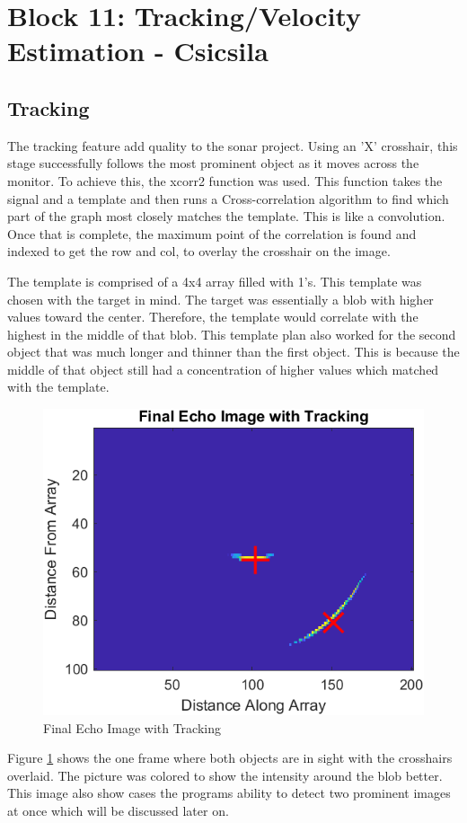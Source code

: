 
\section{Block 11: Tracking/Velocity Estimation - Csicsila}

\subsection{Tracking}
The tracking feature add quality to the sonar project. Using an 'X' crosshair, this stage successfully follows the most prominent object as it moves across the monitor. To achieve this, the xcorr2 function was used. This function takes the signal and a template and then runs a Cross-correlation algorithm to find which part of the graph most closely matches the template. This is like a convolution. Once that is complete, the maximum point of the correlation is found and indexed to get the row and col, to overlay the crosshair on the image. 

The template is comprised of a 4x4 array filled with 1's. This template was chosen with the target in mind. The target was essentially a blob with higher values toward the center. Therefore, the template would correlate with the highest in the middle of that blob. This template plan also worked for the second object that was much longer and thinner than the first object. This is because the middle of that object still had a concentration of higher values which matched with the template.

\begin{figure}[H]
    \centering
    \includegraphics[width=0.5\linewidth]{figures/TrackingImage2.png}
    \caption{Final Echo Image with Tracking}
    \label{fig:TrackingImage2}
\end{figure}

Figure \ref{fig:TrackingImage2} shows the one frame where both objects are in sight with the crosshairs overlaid. The picture was colored to show the intensity around the blob better. This image also show cases the programs ability to detect two prominent images at once which will be discussed later on. 

